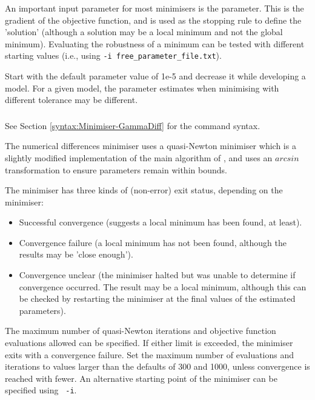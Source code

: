 An important input parameter for most minimisers is the  parameter. This is the gradient of the objective function, and is used as the stopping rule to define the 'solution' (although a solution may be a local minimum and not the global minimum). Evaluating the robustness of a minimum can be tested with different starting values (i.e., using \texttt{-i free\_parameter\_file.txt}).

Start with the default  parameter value of 1e-5 and decrease it while developing a model. For a given model, the parameter estimates when minimising with different tolerance may be different.

\subsubsection{}\label{sec:Minimiser-GammaDiff}

See Section \ref{syntax:Minimiser-GammaDiff} for the command syntax.

The numerical differences minimiser uses a quasi-Newton minimiser which is a slightly modified implementation of the main algorithm of \cite{779}, and uses an $arcsin$ transformation to ensure parameters remain within bounds.

The minimiser has three kinds of (non-error) exit status, depending on the minimiser:

\begin{itemize}
\item Successful convergence (suggests a local minimum has been found, at least).
\item Convergence failure (a local minimum has not been found, although the results may be 'close enough').
\item Convergence unclear (the minimiser halted but was unable to determine if convergence occurred. The result may be a local minimum, although this can be checked by restarting the minimiser at the final values of the estimated parameters).
\end{itemize}

The maximum number of quasi-Newton iterations and objective function evaluations allowed can be specified. If either limit is exceeded, the minimiser exits with a convergence failure. Set the maximum number of evaluations and iterations to values larger than the defaults of 300 and 1000, unless convergence is reached with fewer. An alternative starting point of the minimiser can be specified using \texttt{\cname\ -i}.

